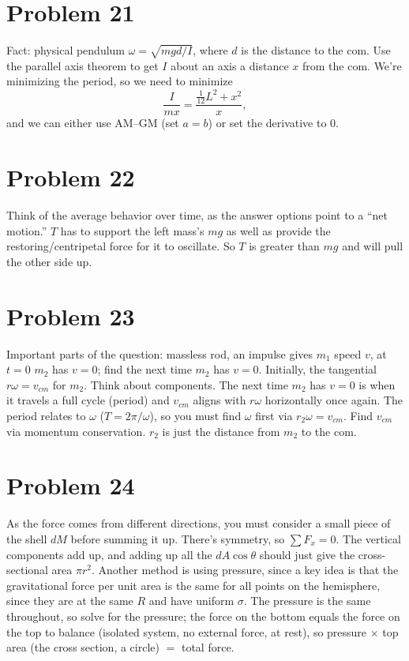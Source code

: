 \documentclass[11pt]{article}
\begin{document}
\section*{Problem 21}
Fact: physical pendulum $\omega=\sqrt{mgd/I}$, where $d$ is the distance to the com.
Use the parallel axis theorem to get $I$ about an axis a distance $x$ from the com.
We're minimizing the period, so we need to minimize
\[
\frac{I}{mx}=\frac{\tfrac1{12}L^2+x^2}{x},
\]
and we can either use AM--GM (set $a=b$) or set the derivative to $0$.

\section*{Problem 22}
Think of the average behavior over time, as the answer options point to a ``net motion.''
$T$ has to support the left mass's $mg$ as well as provide the restoring/centripetal force for it to oscillate. So $T$ is greater than $mg$ and will pull the other side up.

\section*{Problem 23}
Important parts of the question: massless rod, an impulse gives $m_1$ speed $v$, at $t=0$ $m_2$ has $v=0$; find the next time $m_2$ has $v=0$.
Initially, the tangential $r\omega=v_{cm}$ for $m_2$.
Think about components. The next time $m_2$ has $v=0$ is when it travels a full cycle (period) and $v_{cm}$ aligns with $r\omega$ horizontally once again.
The period relates to $\omega$ ($T=2\pi/\omega$), so you must find $\omega$ first via $r_2\omega=v_{cm}$.
Find $v_{cm}$ via momentum conservation. $r_2$ is just the distance from $m_2$ to the com.

\section*{Problem 24}
As the force comes from different directions, you must consider a small piece of the shell $dM$ before summing it up.
There's symmetry, so $\sum F_x=0$.
The vertical components add up, and adding up all the $dA\cos\theta$ should just give the cross-sectional area $\pi r^2$.
Another method is using pressure, since a key idea is that the gravitational force per unit area is the same for all points on the hemisphere, since they are at the same $R$ and have uniform $\sigma$. The pressure is the same throughout, so solve for the pressure; the force on the bottom equals the force on the top to balance (isolated system, no external force, at rest), so pressure $\times$ top area (the cross section, a circle) $=$ total force.
\end{document}
